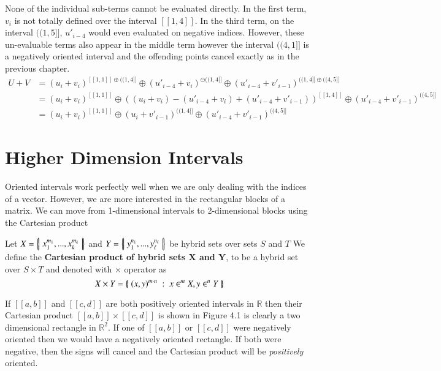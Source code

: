 None of the individual sub-terms cannot be evaluated directly.
In the first term, $v_i$ is not totally defined over the interval $[\![1,4]\!]$.
In the third term, on the interval $(\!(1,5]\!]$, $u'_{i-4}$ would even evaluated on negative indices.
However, these un-evaluable terms also appear in the middle term however the interval $(\!(4,1]\!]$ is a negatively oriented
 interval and the offending points cancel exactly as in the previous chapter.
\begin{align*}
	U + V
		&= (u_i + v_i)^{[\![1,1]\!] \oplus (\!(1,4]\!]} 
			\oplus (u'_{i-4} + v_i)^{\ominus(\!(1,4]\!]} 
			\oplus (u'_{i-4} + v'_{i-1})^{(\!(1,4]\!] \oplus (\!(4,5]\!]}\\
		&= (u_i + v_i)^{[\![1,1]\!]} 
			\oplus \left((u_i + v_i) - (u'_{i-4} + v_i) + (u'_{i-4} + v'_{i-1})\right)^{[\![1,4]\!]} 
			\oplus (u'_{i-4} + v'_{i-1})^{(\!(4,5]\!]} \\ 
		&= (u_i + v_i)^{[\![1,1]\!]} 
			\oplus (u_i + v'_{i-1})^{(\!(1,4]\!]} 
			\oplus (u'_{i-4} + v'_{i-1})^{(\!(4,5]\!]}
\end{align*}

%
%

\section{Higher Dimension Intervals}

Oriented intervals work perfectly well when we are only dealing with the indices of a vector. 
However, we are more interested in the rectangular blocks of a matrix.
We can move from 1-dimensional intervals to 2-dimensional blocks using the Cartesian product
\begin{definition}
	Let $X = \left\{ \! \left| \;  x_1^{m_1}, ... , x_k^{m_k}  \; \right| \! \right\}$ and $Y= \left\{ \! \left| \;  y_1^{n_1}, ... , y_\ell^{n_\ell}  \; \right| \! \right\}$ be hybrid sets
	over sets $S$ and $T$
	We define the \textbf{Cartesian product of hybrid sets $\boldsymbol{X}$ and $\boldsymbol{Y}$}, to be a hybrid set
	over $S \times T$ and denoted with $\times$ operator as
	\begin{equation}
		X \times Y = \left\{ \! \left| \;  (x, y)^{m \cdot n} \; : \; x \in^m X, y \in^n Y  \; \right| \! \right\}
	 \end{equation}
\end{definition}


If $[\![a,b]\!]$ and $[\![c,d]\!]$ are both positively oriented intervals in $\mathbb{R}$ then their Cartesian product 
$[\![a,b]\!] \times [\![c,d]\!]$ is shown in Figure 4.1 is clearly a two dimensional rectangle in $\mathbb{R}^2$.
If one of $[\![a,b]\!]$ or $[\![c,d]\!]$ were negatively oriented then we would have a negatively oriented rectangle.
If both were negative, then the signs will cancel and the Cartesian product will be \emph{positively} oriented.


